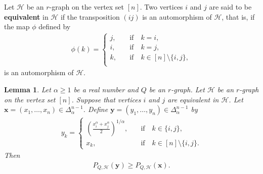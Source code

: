 \documentclass[11pt,a4paper]{article}
\newtheorem{lemma}[definition]{Lemma}
\begin{document}
Let $\mathcal{H}$ be an $r$-graph on the vertex set $[n]$. Two vertices $i$ and $j$ are said to be \textbf{equivalent} in $\mathcal{H}$ if the transposition $(ij)$ is an automorphism of $\mathcal{H}$, that is, if the map $\phi$ defined by 
\begin{align*}
    \phi(k)
    = 
    \begin{cases}
        j, &\quad\text{if}\quad k = i, \\
        i, &\quad\text{if}\quad k = j, \\
        k, &\quad\text{if}\quad k \in [n]\setminus\{i,j\}, \\
    \end{cases}
\end{align*}
is an automorphism of $\mathcal{H}$.

\begin{lemma}\label{LEMMA:KLM-transposition-extend}
    Let $\alpha \ge 1$ be a real number and $Q$ be an $r$-graph. 
    Let $\mathcal{H}$ be an $r$-graph on the vertex set $[n]$. 
    Suppose that vertices $i$ and $j$ are equivalent in $\mathcal{H}$. 
    Let $\mathbf{x} = (x_1, \ldots, x_n) \in \Delta^{n-1}_{\alpha}$.
    Define $\mathbf{y} = (y_1, \ldots, y_n) \in \Delta^{n-1}_{\alpha}$ by
    \begin{align}\label{equ:symm-vector}
        y_k 
        =
        \begin{cases}
            \left(\frac{x_i^{\alpha} + x_j^{\alpha}}{2}\right)^{1/\alpha}, & \quad\text{if}\quad k \in \{i,j\}, \\
            x_k, & \quad\text{if}\quad k \in [n] \setminus \{i,j\}.
        \end{cases}
    \end{align}
    Then 
    \begin{align*}
        P_{Q,\mathcal{H}}(\mathbf{y})
        \ge P_{Q,\mathcal{H}}(\mathbf{x}). 
    \end{align*}
\end{lemma}
\end{document}
